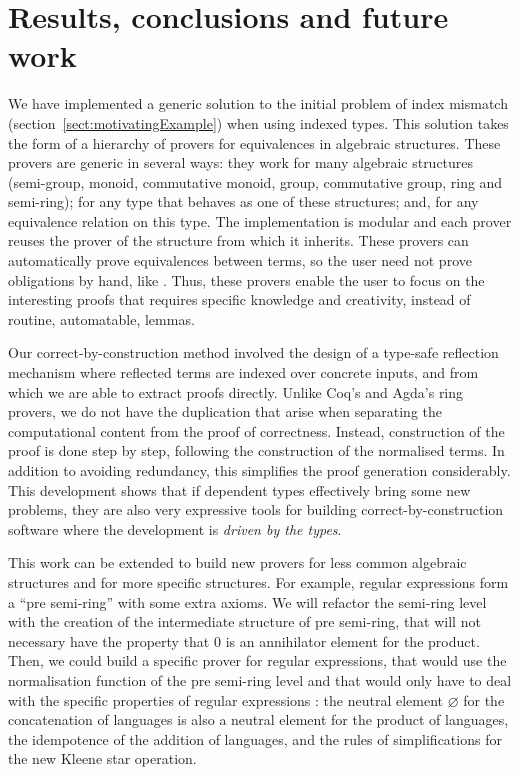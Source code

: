 \section{Results, conclusions and future work}

We have implemented a generic solution to the initial problem of index
mismatch (section~\ref{sect:motivatingExample}) when 
using indexed types. This solution takes the form of a hierarchy of provers for
equivalences in algebraic structures. These provers are generic in several
ways: they work for many algebraic structures (semi-group, monoid, commutative
monoid, group, commutative group, ring and semi-ring); for any type that
behaves as one of these structures; and, for any equivalence relation on this
type. The implementation is
modular and each prover reuses the prover of the structure from which it
inherits. These provers can automatically prove equivalences between terms,
so the user need not prove obligations by hand,
like . Thus, these provers enable the user to focus on the
interesting proofs that requires specific knowledge and creativity, instead of
routine, automatable, lemmas.

Our correct-by-construction method involved the design of a type-safe
reflection mechanism where reflected terms are indexed over concrete inputs,
and from which we are able to extract proofs directly.  Unlike Coq's and Agda's
ring provers, we do not have the duplication that arise when separating the
computational content from the proof of correctness. Instead, construction of
the proof is done step by step, following the construction of the normalised
terms.  In addition to avoiding redundancy, this simplifies the proof
generation considerably. This development shows that if dependent types
effectively bring some new problems, they are also very expressive tools for
building correct-by-construction software where the development is \emph{driven
by the types}.

This work can be extended to build new provers for less common algebraic
structures and for more specific structures. For example, regular expressions
form a ``pre semi-ring'' with some extra axioms. We will refactor the semi-ring
level with the creation of the intermediate structure of pre semi-ring, that
will not necessary have the property that $0$ is an annihilator element for the
product. Then, we could build a specific prover for regular expressions, that
would use the normalisation function of the pre semi-ring level and that would
only have to deal with the specific properties of regular expressions : the
neutral element $\varnothing$ for the concatenation of languages is also a
neutral element for the product of languages, the idempotence of the addition
of languages, and the rules of simplifications for the new Kleene star
operation.


